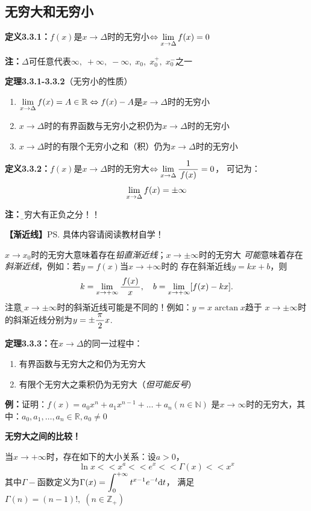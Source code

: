\subsection{无穷大和无穷小}

{\bf 定义3.3.1：}$f(x)$是$x\to\Delta$时的无穷小$\Leftrightarrow\lim\limits_{x\to{\Delta}}f(x)=0$

{\bf 注：}$\Delta$可任意代表$\infty,\;+\infty,\;-\infty,\;x_0,\;x_0^+,\;x_0^-$之一

{\bf 定理3.3.1-3.3.2}（无穷小的性质）
\begin{enumerate}[(1)]
  \setlength{\itemindent}{1cm}
  \item $\lim\limits_{x\to{\Delta}}f(x)=A\in\mathbb{R}\Leftrightarrow
  f(x)-A$是$x\to\Delta$时的无穷小
  \item $x\to\Delta$时的有界函数与无穷小之积仍为$x\to\Delta$时的无穷小
  \item $x\to\Delta$时的有限个无穷小之和（积）仍为$x\to\Delta$时的无穷小
\end{enumerate}

{\bf 定义3.3.2：}$f(x)$是$x\to\Delta$时的无穷大$\Leftrightarrow\lim\limits_{x\to{\Delta}}\displaystyle\frac{\,{1}\,}{\,{f(x)}\,}=0$，
可记为：
$$\lim\limits_{x\to{\Delta}}f(x)=\pm\infty$$

{\bf 注：}{\b 无穷大有正负之分！！}

{\bf 【渐近线】}\ps{具体内容请阅读教材自学！}

$x\to x_0$时的无穷大意味着存在{\it 铅直渐近线}；$x\to\pm\infty$时的无穷大
{\it 可能}意味着存在{\it 斜渐近线}，例如：若$y=f(x)$当$x\to+\infty$时的
存在斜渐近线$y=kx+b$，则
$$k=\lim\limits_{x\to{+\infty}}\displaystyle\frac{\,{f(x)}\,}{\,{x}\,},\quad b=\lim\limits_{x\to{+\infty}}[f(x)-kx].$$
注意，{\b $x\to\pm\infty$时的斜渐近线可能是不同的！}例如：$y=x\arctan x$趋于
$x\to\pm\infty$时的斜渐近线分别为$y=\pm\displaystyle\frac{\,{\pi}\,}{\,{2}\,}x$.


{\bf 定理3.3.3：}在$x\to\Delta$的同一过程中：
\begin{enumerate}[(1)]
  \setlength{\itemindent}{1cm}
  \item 有界函数与无穷大之和仍为无穷大
  \item 有限个无穷大之乘积仍为无穷大（{\it 但可能反号}）
\end{enumerate}

{\bf 例：}证明：$f(x)=a_0x^n+a_1x^{n-1}+\ldots+a_n(n\in\mathbb{N})$
是$x\to\infty$时的无穷大，其中：$a_0,a_1,\ldots,a_n\in\mathbb{R},a_0\ne 0$

\begin{shaded}
	{\bf 无穷大之间的比较！}
	
	当$x\to+\infty$时，存在如下的大小关系：设$a>0$，
	$$\ln x<<x^a<<e^x<<\Gamma(x)<<x^x$$
	其中$\Gamma-$函数定义为$\Gamma(x)=\displaystyle\int_0^{+\infty}t^{x-1}e^{-t}\mathrm{d} t$，
	满足$\Gamma(n)=(n-1)!,\;(n\in\mathbb{Z}_+)$
\end{shaded}

